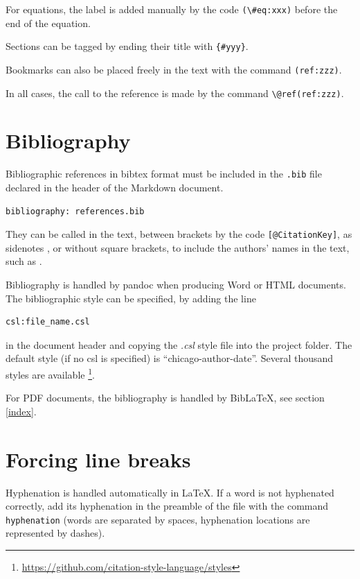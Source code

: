 \documentclass[
  12pt,
  american,
  a4paper,
  extrafontsizes,onecolumn,openright
  ]{memoir}
\begin{document}
For equations, the label is added manually by the code \texttt{(\textbackslash{}\#eq:xxx)} before the end of the equation.

Sections can be tagged by ending their title with \texttt{\{\#yyy\}}.

Bookmarks can also be placed freely in the text with the command \texttt{(ref:zzz)}.

In all cases, the call to the reference is made by the command \texttt{\textbackslash{}@ref(ref:zzz)}.

\hypertarget{bibliography}{%
\section{Bibliography}\label{bibliography}}

Bibliographic references in bibtex format must be included in the \texttt{.bib} file declared in the header of the Markdown document.

\begin{verbatim}
bibliography: references.bib
\end{verbatim}

They can be called in the text, between brackets by the code \texttt{{[}@CitationKey{]}}, as sidenotes \autocite{Xie2016}, or without square brackets, to include the authors' names in the text, such as \textcite{Xie2018} .

Bibliography is handled by pandoc when producing Word or HTML documents.
The bibliographic style can be specified, by adding the line

\begin{verbatim}
csl:file_name.csl
\end{verbatim}

in the document header and copying the \emph{.csl} style file into the project folder.
The default style (if no csl is specified) is \enquote{chicago-author-date}.
Several thousand styles are available \footnote{\url{https://github.com/citation-style-language/styles}}.

For PDF documents, the bibliography is handled by BibLaTeX, see section \ref{index}.

\hypertarget{forcing-line-breaks}{%
\section{Forcing line breaks}\label{forcing-line-breaks}}

Hyphenation is handled automatically in LaTeX.
If a word is not hyphenated correctly, add its hyphenation in the preamble of the file with the command \texttt{hyphenation} (words are separated by spaces, hyphenation locations are represented by dashes).
\end{document}
